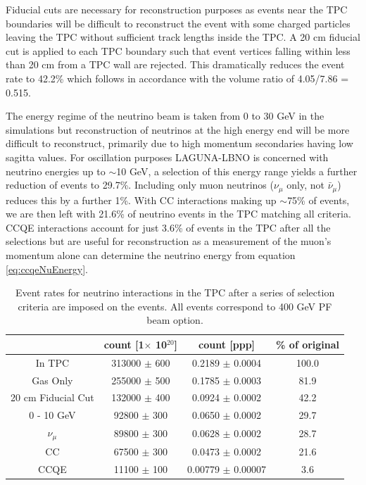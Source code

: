 Fiducial cuts are necessary for reconstruction purposes as events near the TPC boundaries will be difficult to reconstruct the event with some charged particles leaving the TPC without sufficient track lengths inside the TPC. A 20 cm fiducial cut is applied to each TPC boundary such that event vertices falling within less than 20 cm from a TPC wall are rejected. This dramatically reduces the event rate to 42.2\% which follows in accordance with the volume ratio of 4.05/7.86 = 0.515. 

The energy regime of the neutrino beam is taken from 0 to 30 GeV in the simulations but reconstruction of neutrinos at the high energy end will be more difficult to reconstruct, primarily due to high momentum secondaries having low sagitta values. For oscillation purposes LAGUNA-LBNO is concerned with neutrino energies up to $\sim$10 GeV, a selection of this energy range yields a further reduction of events to 29.7\%. Including only muon neutrinos ($\nu_{\mu}$ only, not $\bar{\nu}_{\mu}$) reduces this by a further 1\%. With CC interactions making up $\sim$75\% of events, we are then left with 21.6\% of neutrino events in the TPC matching all criteria. CCQE interactions account for just 3.6\% of events in the TPC after all the selections but are useful for reconstruction as a measurement of the muon's momentum alone can determine the neutrino energy from equation \ref{eq:ccqeNuEnergy}.

\begin{table}[htbp]
	\begin{center}
	\begin{tabular}{|c||c|c|c|}
		\hline  
		& \textbf{count [1$\times$ 10$^{20}$]} & \textbf{count [ppp]} & \textbf{\% of original} \\
		\hline
		{In TPC} & 313000 $\pm$ 600 & 0.2189 $\pm$ 0.0004 &  {100.0} \\
		{Gas Only} & 255000 $\pm$ 500 & 0.1785 $\pm$ 0.0003 & {81.9} \\
	 	{20 cm Fiducial Cut} & 132000 $\pm$ 400 & 0.0924 $\pm$ 0.0002 & {42.2} \\
		{0 - 10 GeV} & 92800 $\pm$ 300 & 0.0650 $\pm$ 0.0002 & {29.7} \\
		{$\nu_{\mu}$} & 89800 $\pm$ 300 & 0.0628 $\pm$ 0.0002 & {28.7} \\
		{CC} & 67500 $\pm$ 300 & 0.0473 $\pm$ 0.0002 & {21.6} \\
		{CCQE} & 11100 $\pm$ 100 & 0.00779 $\pm$ 0.00007 & {3.6} \\
		\hline
	\end{tabular}
	\end{center}
	\caption{Event rates for neutrino interactions in the TPC after a series of selection criteria are imposed on the events. All events correspond to 400 GeV PF beam option.}
	\label{tab:nuEventSelection}
\end{table}

